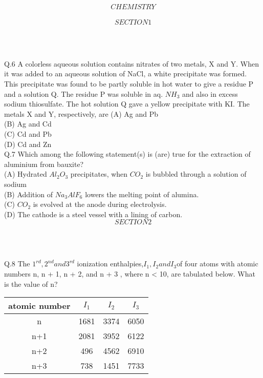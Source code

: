 \documentclass[11pt]{article}
\begin{document}
                        $$CHEMISTRY$$\\
                        $$SECTION1$$\\
\begin{center}
 \\
\end{center} 
Q.6 A colorless aqueous solution contains nitrates of two metals, X and Y. When it was added to an aqueous solution of NaCl, a white precipitate was formed. This precipitate was found to be partly soluble in hot water to give a residue P and a solution Q. The residue P was soluble in aq. $NH_3$ and also in excess sodium thiosulfate. The hot solution Q gave a yellow precipitate with KI. The metals X and Y, respectively, are
(A) Ag and Pb \\
(B) Ag and Cd\\
(C) Cd and Pb\\
(D) Cd and Zn\\                     
Q.7 Which among the following statement(s) is (are) true for the extraction of aluminium from bauxite?\\
(A) Hydrated $Al_2 O_3$ precipitates, when $CO_2$ is bubbled through a solution of sodium\\
(B) Addition of $Na_3 AlF_6$ lowers the melting point of alumina.\\
(C) $CO_2$ is evolved at the anode during electrolysis.\\
(D) The cathode is a steel vessel with a lining of carbon.\\ 
\newpage
                          $$SECTION2$$\\
\begin{center}
 \\
\end{center}
Q.8 The $1^{rd},2^{nd} and 3^{rd}$ ionization enthalpies,$I_1,I_2 and I_3$of four atoms with atomic numbers n, n + 1, n + 2, and n + 3 , where n < 10, are tabulated below. What is the value of n? 
\begin{center}
\begin{tabular}{|c|c|c|c|}
\hline
atomic number & $I_1$ & $I_2$ & $I_3$\\\hline
n & 1681 & 3374 & 6050\\\hline
n+1 & 2081 & 3952 &6122\\\hline
n+2 & 496 & 4562 & 6910\\\hline
n+3 & 738 & 1451 & 7733\\\hline
\end{tabular}
\end{center}
\end{document}
